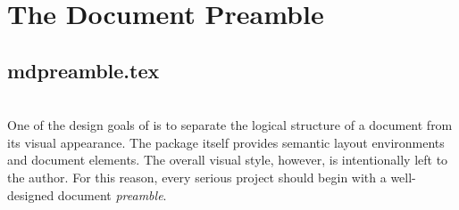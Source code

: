 \documentclass[
11pt,
a4paper,
oneside
]{scrbook}
\begin{document}
\chapter{The Document Preamble}
\section{mdpreamble.tex}
\\
One of the design goals of \mdlayout{} is to separate the logical
structure of a document from its visual appearance.
The package itself provides semantic layout environments and document
elements. The overall visual style, however, is intentionally left to the
author.
For this reason, every serious \mdlayout{} project should begin with
a well-designed document \emph{preamble}.
\end{document}
